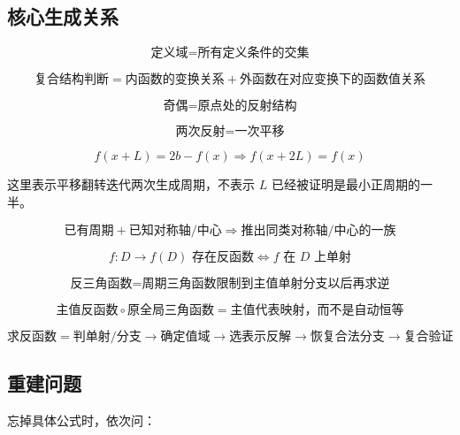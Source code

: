 \documentclass[11pt,a4paper]{ctexart}
\begin{document}
\subsection{核心生成关系}\label{ux4e09ux6761ux751fux6210ux5173ux7cfb}

\[
\boxed{\text{定义域}=\text{所有定义条件的交集}}
\]

\[
\boxed{\text{复合结构判断}=\text{内函数的变换关系}+\text{外函数在对应变换下的函数值关系}}
\]

\[
\boxed{\text{奇偶}=\text{原点处的反射结构}}
\]

\[
\boxed{\text{两次反射}=\text{一次平移}}
\]

\[
\boxed{f(x+L)=2b-f(x)\Rightarrow f(x+2L)=f(x)}
\]

这里表示平移翻转迭代两次生成周期，不表示 \(L\) 已经被证明是最小正周期的一半。

\[
\boxed{\text{已有周期}+\text{已知对称轴/中心}\Rightarrow\text{推出同类对称轴/中心的一族}}
\]

\[
\boxed{f:D\to f(D)\text{ 存在反函数}\Longleftrightarrow f\text{ 在 }D\text{ 上单射}}
\]

\[
\boxed{
\text{反三角函数}
=
\text{周期三角函数限制到主值单射分支以后再求逆}
}
\]

\[
\boxed{
\text{主值反函数}\circ\text{原全局三角函数}
=
\text{主值代表映射，而不是自动恒等}
}
\]

\[
\boxed{
\text{求反函数}
=
\text{判单射/分支}
\to
\text{确定值域}
\to
\text{选表示反解}
\to
\text{恢复合法分支}
\to
\text{复合验证}
}
\]

\subsection{重建问题}\label{ux91cdux5efaux95eeux9898}

忘掉具体公式时，依次问：
\end{document}
